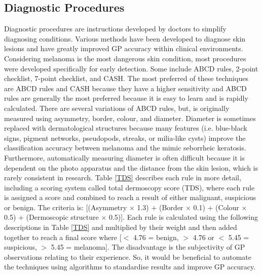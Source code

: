 \subsection{Diagnostic Procedures}
Diagnostic procedures are instructions developed by doctors to simplify diagnosing conditions. Various methods have been developed to diagnose skin lesions and have greatly improved GP accuracy within clinical environments\cite{Nachbar1994, unlu2014}. Considering melanoma is the most dangerous skin condition, most procedures were developed specifically for early detection. Some include ABCD rules, 2-point checklist, 7-point checklist, and CASH. The most preferred of these techniques are ABCD rules and CASH because they have a higher sensitivity\cite{unlu2014} and ABCD rules are generally the most preferred because it is easy to learn and is rapidly calculated\cite{Nachbar1994}. There are several variations of ABCD rules, but, is originally measured using asymmetry, border, colour, and diameter. Diameter is sometimes replaced with dermatological structures because many features (i.e. blue-black signs, pigment networks, pseudopods, streaks, or milia-like cysts\cite{Stricklin2011}) improve the classification accuracy between melanoma and the mimic seborrheic keratosis\cite{Cognetta1994}. Furthermore, automatically measuring diameter is often difficult because it is dependent on the photo apparatus and the distance from the skin lesion, which is rarely consistent in research. Table \ref{TDS} describes each rule in more detail, including a scoring system called total dermoscopy score (TDS), where each rule is assigned a score and combined to reach a result of either malignant, suspicious or benign. The criteria is: [(Asymmetry $\times$ 1.3) + (Border $\times$ 0.1) + (Colour $\times$ 0.5) + (Dermoscopic structure $\times$ 0.5)]. Each rule is calculated using the following descriptions in Table \ref{TDS} and multiplied by their weight and then added together to reach a final score where [$<$ 4.76 = benign, $>$ 4.76 or $<$ 5.45 = suspicious, $>$ 5.45 = melanoma]. The disadvantage is the subjectivity of GP observations relating to their experience. So, it would be beneficial to automate the techniques using algorithms to standardise results and improve GP accuracy.

